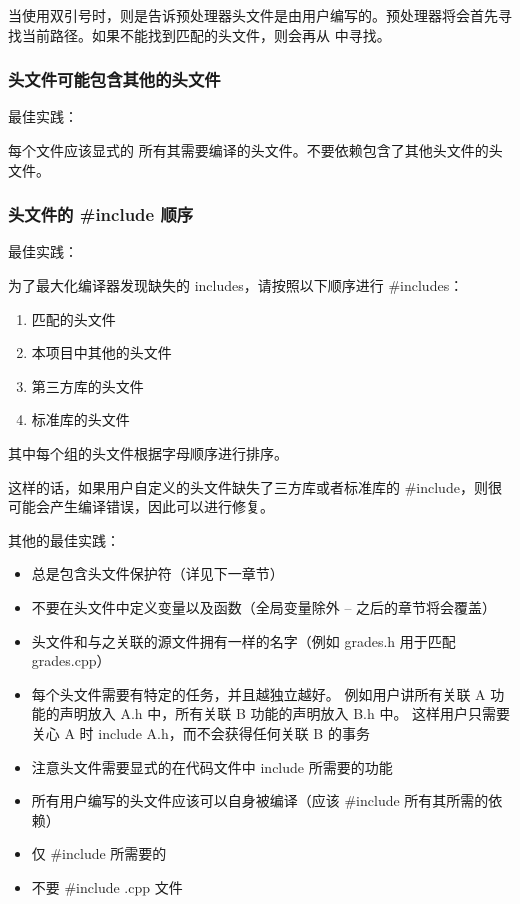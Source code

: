 \documentclass[../../LearnCpp.tex]{subfiles}
\begin{document}
当使用双引号时，则是告诉预处理器头文件是由用户编写的。预处理器将会首先寻找当前路径。如果不能找到匹配的头文件，则会再从  中寻找。

\subsubsection*{头文件可能包含其他的头文件}

最佳实践：

每个文件应该显式的  所有其需要编译的头文件。不要依赖包含了其他头文件的头文件。

\subsubsection*{头文件的 \#include 顺序}

最佳实践：

为了最大化编译器发现缺失的 includes，请按照以下顺序进行 \#includes：

\begin{enumerate}
  \item 匹配的头文件
  \item 本项目中其他的头文件
  \item 第三方库的头文件
  \item 标准库的头文件
\end{enumerate}

其中每个组的头文件根据字母顺序进行排序。

这样的话，如果用户自定义的头文件缺失了三方库或者标准库的 \#include，则很可能会产生编译错误，因此可以进行修复。

其他的最佳实践：

\begin{itemize}
  \item 总是包含头文件保护符（详见下一章节）
  \item 不要在头文件中定义变量以及函数（全局变量除外 -- 之后的章节将会覆盖）
  \item 头文件和与之关联的源文件拥有一样的名字（例如 grades.h 用于匹配 grades.cpp）
  \item 每个头文件需要有特定的任务，并且越独立越好。
        例如用户讲所有关联 A 功能的声明放入 A.h 中，所有关联 B 功能的声明放入 B.h 中。
        这样用户只需要关心 A 时 include A.h，而不会获得任何关联 B 的事务
  \item 注意头文件需要显式的在代码文件中 include 所需要的功能
  \item 所有用户编写的头文件应该可以自身被编译（应该 \#include 所有其所需的依赖）
  \item 仅 \#include 所需要的
  \item 不要 \#include .cpp 文件
\end{itemize}
\end{document}
